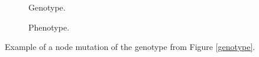 \begin{figure}[htb]
    \begin{mdframed}
        \begin{subfigure}[b]{0.45\textwidth}
            \centering
            \resizebox{1\textwidth}{!}{}
            \caption{Genotype.}
            \label{node_genotype}
        \end{subfigure}
        \begin{subfigure}[b]{0.45\textwidth}
            \centering
            \resizebox{0.65\textwidth}{!}{}
            \caption{Phenotype.}
            \label{node_phenotype}
        \end{subfigure}
    \end{mdframed}
    \caption{Example of a node mutation of the genotype from Figure \ref{genotype}.}
    \label{node_mutation}
\end{figure}
